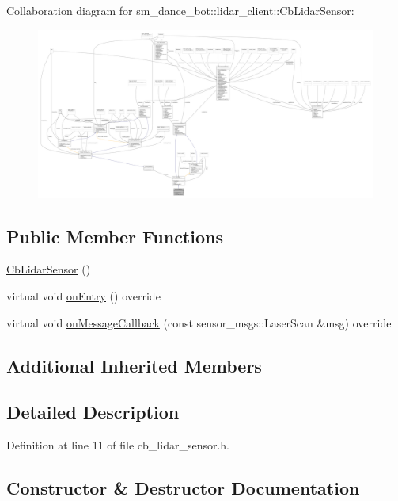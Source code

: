 Collaboration diagram for sm\+\_\+dance\+\_\+bot\+:\+:lidar\+\_\+client\+:\+:Cb\+Lidar\+Sensor\+:
\nopagebreak
\begin{figure}[H]
\begin{center}
\leavevmode
\includegraphics[width=350pt]{structsm__dance__bot_1_1lidar__client_1_1CbLidarSensor__coll__graph}
\end{center}
\end{figure}
\subsection*{Public Member Functions}
\begin{DoxyCompactItemize}
\item 
\hyperlink{structsm__dance__bot_1_1lidar__client_1_1CbLidarSensor_a11592c75e2a80527383d524c200e408d}{Cb\+Lidar\+Sensor} ()
\item 
virtual void \hyperlink{structsm__dance__bot_1_1lidar__client_1_1CbLidarSensor_abf066a918c12594ed4b71803fe00159a}{on\+Entry} () override
\item 
virtual void \hyperlink{structsm__dance__bot_1_1lidar__client_1_1CbLidarSensor_a8249fc5179e671bb5e96114eefc45537}{on\+Message\+Callback} (const sensor\+\_\+msgs\+::\+Laser\+Scan \&msg) override
\end{DoxyCompactItemize}
\subsection*{Additional Inherited Members}


\subsection{Detailed Description}


Definition at line 11 of file cb\+\_\+lidar\+\_\+sensor.\+h.



\subsection{Constructor \& Destructor Documentation}
